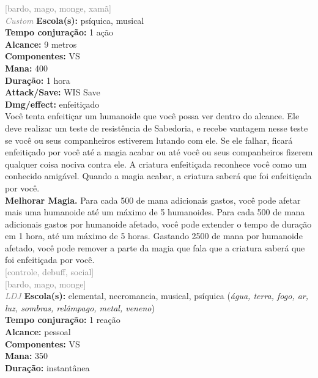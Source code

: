 \documentclass{RPG_Adventure}[2021/10/20]
\begin{document}
{\scriptsize \textcolor{gray}{[bardo, mago, monge, xamã]\\}}
{\tiny \textcolor{gray}{\textit{Custom}}}\jump{}
{\small \t \textbf{Escola(s):} psíquica, musical\\\t \textbf{Tempo conjuração:} 1 ação\\\t \textbf{Alcance:} 9 metros\\\t \textbf{Componentes:} VS\\\t \textbf{Mana:} 400\\\t \textbf{Duração:} 1 hora\\\t \textbf{Attack/Save:} WIS Save\\\t \textbf{Dmg/effect:} enfeitiçado\\}
{\normalsize Você tenta enfeitiçar um humanoide que você possa ver dentro do alcance. Ele deve realizar um teste de resistência de Sabedoria, e recebe vantagem nesse teste se você ou seus companheiros estiverem lutando com ele.  Se ele falhar, ficará enfeitiçado por você até a magia acabar ou até você ou seus companheiros fizerem qualquer coisa nociva contra ele. A criatura enfeitiçada reconhece você como um conhecido amigável. Quando a magia acabar, a criatura saberá que foi enfeitiçada por você.\\\t \textbf{Melhorar Magia.} Para cada 500 de mana adicionais gastos, você pode afetar mais uma humanoide até um máximo de 5 humanoides. Para cada 500 de mana adicionais gastos por humanoide afetado, você pode extender o tempo de duração em 1 hora, até um máximo de 5 horas. Gastando 2500 de mana por humanoide afetado, você pode remover a parte da magia que fala que a criatura saberá que foi enfeitiçada por você.\\}
{\scriptsize \textcolor{gray}{[controle, debuff, social]\\}}
{\scriptsize \textcolor{gray}{[bardo, mago, monge]\\}}
{\tiny \textcolor{gray}{\textit{LDJ}}}\jump{}
{\small \t \textbf{Escola(s):} elemental, necromancia, musical, psíquica (\textit{água, terra, fogo, ar, luz, sombras, relâmpago, metal, veneno})\\\t \textbf{Tempo conjuração:} 1 reação\\\t \textbf{Alcance:} pessoal\\\t \textbf{Componentes:} VS\\\t \textbf{Mana:} 350\\\t \textbf{Duração:} instantânea\\}
\end{document}
